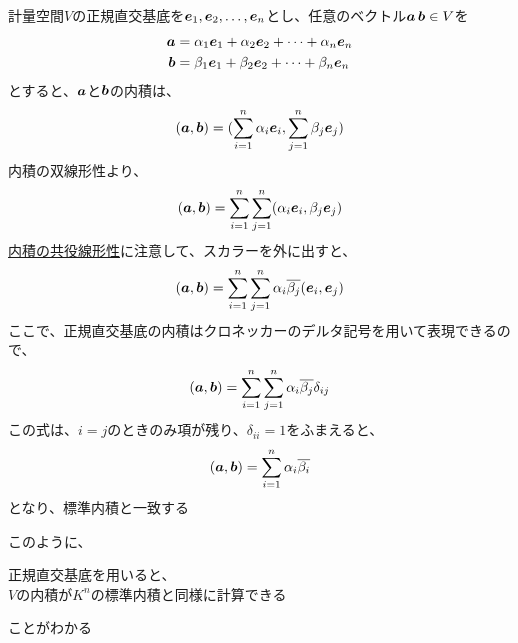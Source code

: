 \documentclass[../../../topic_linear-algebra]{subfiles}
\begin{document}
計量空間$V$の正規直交基底を$\vb*{e}_1, \vb*{e}_2, \ldots, \vb*{e}_n$とし、任意のベクトル$\vb*{a}\,\vb*{b} \in V$を
\begin{align*}
  \vb*{a} & = \alpha_1 \vb*{e}_1 + \alpha_2 \vb*{e}_2 + \cdots + \alpha_n \vb*{e}_n \\
  \vb*{b} & = \beta_1 \vb*{e}_1 + \beta_2 \vb*{e}_2 + \cdots + \beta_n \vb*{e}_n
\end{align*}
とすると、$\vb*{a}$と$\vb*{b}$の内積は、
\begin{equation*}
  (\vb*{a},\vb*{b}) = (\sum_{i=1}^n \alpha_i \vb*{e}_i, \sum_{j=1}^n \beta_j \vb*{e}_j)
\end{equation*}
内積の双線形性より、
\begin{equation*}
  (\vb*{a},\vb*{b}) = \sum_{i=1}^n \sum_{j=1}^n (\alpha_i \vb*{e}_i, \beta_j \vb*{e}_j)
\end{equation*}
\hyperref[thm:conjugate-linearity-of-inner-product]{内積の共役線形性}に注意して、スカラーを外に出すと、
\begin{equation*}
  (\vb*{a},\vb*{b}) = \sum_{i=1}^n \sum_{j=1}^n \alpha_i \overline{\beta_j} (\vb*{e}_i, \vb*{e}_j)
\end{equation*}
ここで、正規直交基底の内積はクロネッカーのデルタ記号を用いて表現できるので、
\begin{equation*}
  (\vb*{a},\vb*{b}) = \sum_{i=1}^n \sum_{j=1}^n \alpha_i \overline{\beta_j} \delta_{ij}
\end{equation*}
この式は、$i=j$のときのみ項が残り、$\delta_{ii} = 1$をふまえると、
\begin{equation*}
  (\vb*{a},\vb*{b}) = \sum_{i=1}^n \alpha_i \overline{\beta_i}
\end{equation*}
となり、標準内積と一致する

\br

このように、
\begin{shaded}
  正規直交基底を用いると、\\
  $V$の内積が$K^n$の標準内積と同様に計算できる
\end{shaded}
ことがわかる
\end{document}
